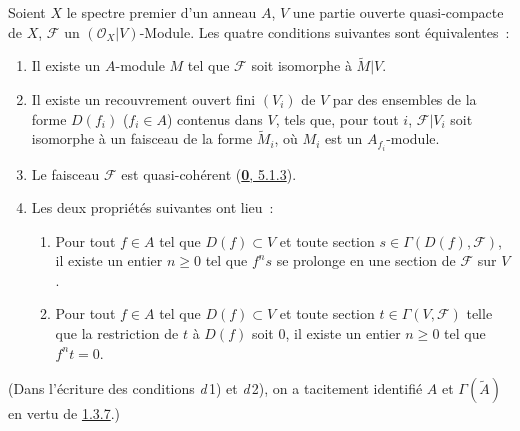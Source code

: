 \begin{theorem}[1.4.1]
\label{I.1.4.1-fr}
Soient $X$ le spectre premier d'un anneau $A$, $V$ une partie ouverte
quasi-compacte de $X$, $\mathscr{F}$ un $(\mathscr{O}_X|V)$-Module. Les
quatre conditions suivantes sont équivalentes~:
\begin{enumerate}
  \item[\textup{a)}] Il existe un $A$-module $M$ tel que $\mathscr{F}$ soit
  isomorphe à $\widetilde{M}|V$.
  \item[\textup{b)}] Il existe un recouvrement ouvert fini $(V_i)$ de $V$ par des
  ensembles de la forme $D(f_i)$ ($f_i\in A$) contenus dans $V$, tels que,
  pour tout $i$, $\mathscr{F}|V_i$ soit isomorphe à un faisceau de la forme
  $\widetilde{M}_i$, où $M_i$ est un $A_{f_i}$-module.
  \item[\textup{c)}] Le faisceau $\mathscr{F}$ est quasi-cohérent
  \textup{(\hyperref[0.5.1.3-fr]{\textbf{0}, 5.1.3})}.
  \item[\textup{d)}] Les deux propriétés suivantes ont lieu~:
  \begin{enumerate}
    \item[\textup{d\,1)}] Pour tout $f\in A$ tel que $D(f)\subset V$ et toute
    section $s\in\Gamma(D(f),\mathscr{F})$, il existe un entier $n\geq0$ tel
    que $f^n s$ se prolonge en une section de $\mathscr{F}$ sur $V$.
    \item[\textup{d\,2)}] Pour tout $f\in A$ tel que $D(f)\subset V$ et toute
    section $t\in\Gamma(V,\mathscr{F})$ telle que la restriction de $t$ à
    $D(f)$ soit $0$, il existe un entier $n\geq0$ tel que $f^n t=0$.
  \end{enumerate}
\end{enumerate}
\end{theorem}

(Dans l'écriture des conditions \textit{d}\,1) et \textit{d}\,2), on a tacitement identifié $A$
et $\Gamma(\widetilde{A})$ en vertu de
\hyperref[I.1.3.7-fr]{1.3.7}.)

